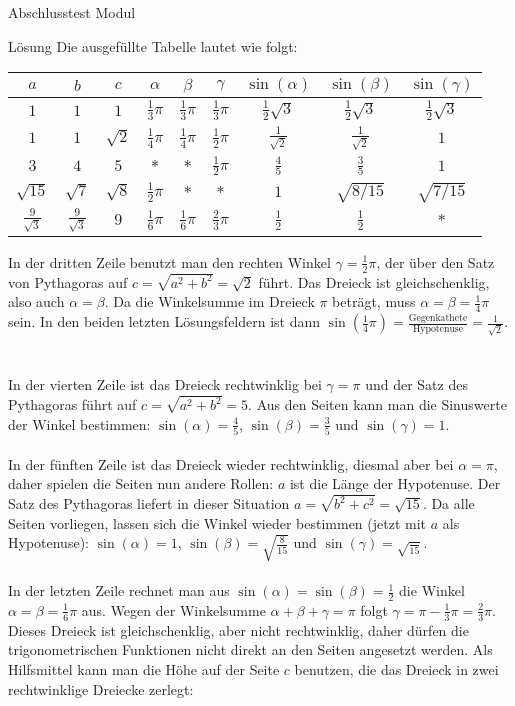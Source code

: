 \begin{MTest}{Abschlusstest Modul }
\begin{MExercise}
\begin{MHint}{L\"osung}
Die ausgef\"ullte Tabelle lautet wie folgt:
\begin{center}
\begin{tabular}{|c|c|c|c|c|c|c|c|c|}
\hline
$a$ & $b$ & $c$ & $\alpha$ & $\beta$ & $\gamma$& $\sin(\alpha)$ & $\sin(\beta)$ & $\sin(\gamma)$ \\ \hline
$1$ & $1$ & $1$ & $\frac13\pi$ & $\frac13\pi$ & $\frac13\pi$ & $\frac12\sqrt3$& $\frac12\sqrt3$& $\frac12\sqrt3$ \\
$1$ & $1$ & $\sqrt2$ & $\frac14\pi$ & $\frac14\pi$ & $\frac12\pi$ & $\frac1{\sqrt2}$ & $\frac1{\sqrt2}$ & $1$   \\ 
$3$ & $4$ & $5$ & $*$ & $*$ & $\frac12\pi$ & $\frac45$ & $\frac35$ & $1$ \\
$\sqrt{15}$ & $\sqrt7$ & $\sqrt8$ & $\frac12\pi$ & $*$ & $*$ & $1$ & $\sqrt{8/15}$ & $\sqrt{7/15}$ \\
$\frac{9}{\sqrt3}$ & $\frac{9}{\sqrt3}$ & $9$ & $\frac16\pi$ &$\frac16\pi$ & $\frac23\pi$ & $\frac12$ & $\frac12$ & $*$\\
\hline
\end{tabular}
\end{center}
In der dritten Zeile benutzt man den rechten Winkel $\gamma=\frac12\pi$, der \"uber den Satz von Pythagoras auf $c=\sqrt{a^2+b^2}=\sqrt2$ f\"uhrt.
Das Dreieck ist gleichschenklig, also auch $\alpha=\beta$. Da die Winkelsumme
im Dreieck $\pi$ betr\"agt, muss $\alpha=\beta=\frac14\pi$ sein. In den beiden letzten L\"osungsfeldern ist dann $\sin(\frac14\pi)=\frac{\text{Gegenkathete}}{\text{Hypotenuse}}=\frac1{\sqrt2}$.
\ \\ \ \\
In der vierten Zeile ist das Dreieck rechtwinklig bei $\gamma=\pi$ und der Satz des Pythagoras f\"uhrt auf $c=\sqrt{a^2+b^2}=5$. Aus den Seiten kann man die Sinuswerte der Winkel bestimmen: $\sin(\alpha)=\frac45$, $\sin(\beta)=\frac35$ und $\sin(\gamma)=1$.
\ \\ \ \\
In der f\"unften Zeile ist das Dreieck wieder rechtwinklig, diesmal aber bei $\alpha=\pi$, daher spielen die Seiten nun andere Rollen: $a$ ist die L\"ange der Hypotenuse.
Der Satz des Pythagoras liefert in dieser Situation $a=\sqrt{b^2+c^2}=\sqrt{15}$. Da alle Seiten vorliegen, lassen sich die Winkel wieder bestimmen (jetzt mit $a$ als Hypotenuse): $\sin(\alpha)=1$, $\sin(\beta)=\sqrt{\frac{8}{15}}$ und $\sin(\gamma)=\sqrt{\frac{}{15}}$.
\ \\ \ \\
In der letzten Zeile rechnet man aus $\sin(\alpha)=\sin(\beta)=\frac12$ die Winkel $\alpha=\beta=\frac16\pi$ aus. Wegen der Winkelsumme $\alpha+\beta+\gamma=\pi$ folgt $\gamma=\pi-\frac13\pi=\frac23\pi$.
Dieses Dreieck ist gleichschenklig, aber nicht rechtwinklig, daher d\"urfen die trigonometrischen Funktionen nicht direkt an den Seiten angesetzt werden. Als Hilfsmittel kann man die H\"ohe auf der Seite $c$
benutzen, die das Dreieck in zwei rechtwinklige Dreiecke zerlegt:


\end{MHint}
\end{MExercise}
\end{MTest}
